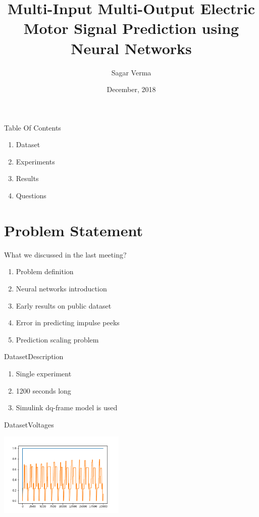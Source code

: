 \documentclass[handout]{beamer}
\title[ \insertdate]{Multi-Input Multi-Output Electric Motor Signal Prediction using Neural Networks}
\author{Sagar Verma}
\institute[Centralesup\'elec and Schneider Electric] %
{
  Centre de Vision Num\'erique,\\
  Centralesup\'elec, Gif-sur-Yvette}
\date{December, 2018}
\begin{document}
\begin{frame}
\titlepage
\end{frame}

\begin{frame}{Table Of Contents}
\begin{enumerate}
\item Dataset
\item Experiments
\item Results
\item Questions
\end{enumerate}
\end{frame}

\section{Problem Statement}

\begin{frame}{What we discussed in the last meeting?}
\begin{enumerate}
  \item Problem definition
  \item Neural networks introduction
  \item Early results on public dataset
  \item Error in predicting impulse peeks
  \item Prediction scaling problem
\end{enumerate}
\end{frame}


\begin{frame}{Dataset}{Description}
  \begin{enumerate}
    \item Single experiment
    \item 1200 seconds long
    \item Simulink dq-frame model is used
  \end{enumerate}
\end{frame}

\begin{frame}{Dataset}{Voltages}
\begin{center}
  \includegraphics[width=0.8\linewidth, height=4cm]{images/voltages}
\end{center}
\end{frame}
\end{document}
